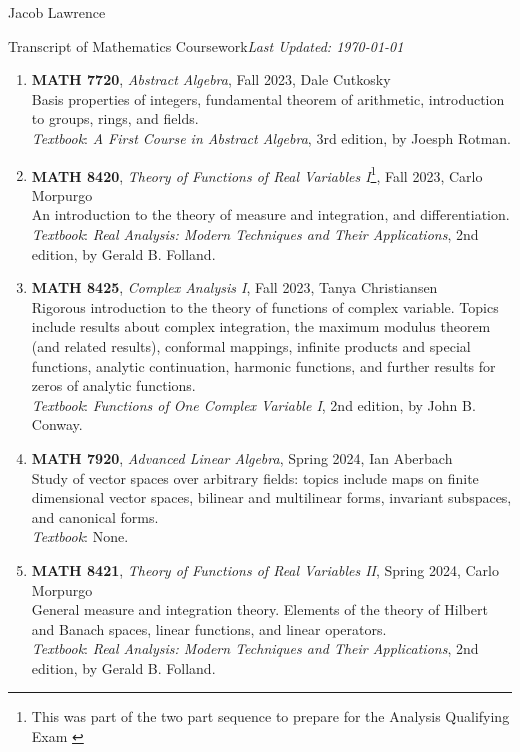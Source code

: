 \documentclass{article}
\begin{document}
\huge Jacob Lawrence

\large Transcript of Mathematics Coursework\hfill \normalsize \textit{Last Updated: \today}

\begin{enumerate}[leftmargin=0in]
    \item[] \textbf{MATH 7720}, \textit{Abstract Algebra}, Fall 2023, Dale Cutkosky \\ 
    Basis properties of integers, fundamental theorem of arithmetic, introduction to groups, rings, and fields.\\
    \textit{Textbook}: \textit{A First Course in Abstract Algebra}, 3rd edition, by Joesph Rotman.  

    \item[] \textbf{MATH 8420}, \textit{Theory of Functions of Real Variables I}\footnote{This was part of the two part sequence to prepare for the Analysis Qualifying Exam \label{Analysis Qual}}, Fall 2023, Carlo Morpurgo\\
    An introduction to the theory of measure and integration, and differentiation.  \\
    \textit{Textbook}: \textit{Real Analysis: Modern Techniques and Their Applications}, 2nd edition, by Gerald B. Folland. 

    \item[] \textbf{MATH 8425}, \textit{Complex Analysis I}, Fall 2023, Tanya Christiansen\\
    Rigorous introduction to the theory of functions of complex variable. Topics include results about complex integration, the maximum modulus theorem (and related results), conformal mappings, infinite products and special functions, analytic continuation, harmonic functions, and further results for zeros of analytic functions. \\
    \textit{Textbook}: \textit{Functions of One Complex Variable I}, 2nd edition, by John B. Conway. 
    
    \item[] \textbf{MATH 7920}, \textit{Advanced Linear Algebra}, Spring 2024, Ian Aberbach\\
    Study of vector spaces over arbitrary fields: topics include maps on finite dimensional vector spaces, bilinear and multilinear forms, invariant subspaces, and canonical forms. \\
    \textit{Textbook}: None.  

    \item[] \textbf{MATH 8421}, \textit{Theory of Functions of Real Variables II}, Spring 2024, Carlo Morpurgo \\
    General measure and integration theory. Elements of the theory of Hilbert and Banach spaces, linear functions, and linear operators. \\
    \textit{Textbook}: \textit{Real Analysis: Modern Techniques and Their Applications}, 2nd edition, by Gerald B. Folland. 


\end{enumerate}
\end{document}
